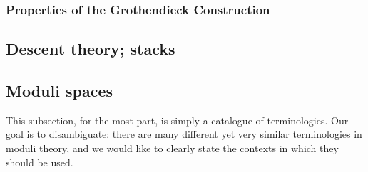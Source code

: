             \subsubsection{Properties of the Grothendieck Construction}
            
            \subsection{Descent theory; stacks}
            
        \subsection{Moduli spaces}
            This subsection, for the most part, is simply a catalogue of terminologies. Our goal is to disambiguate: there are many different yet very similar terminologies in moduli theory, and we would like to clearly state the contexts in which they should be used.
            
